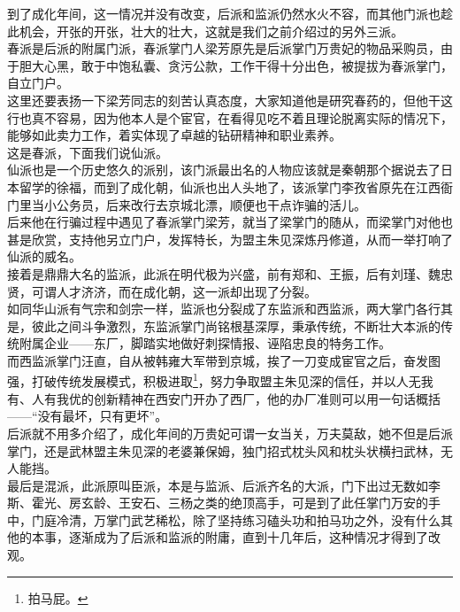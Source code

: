 \begin{multicols}{\theparacolNo}
到了成化年间，这一情况并没有改变，后派和监派仍然水火不容，而其他门派也趁此机会，开张的开张，壮大的壮大，这就是我们之前介绍过的另外三派。\\

春派是后派的附属门派，春派掌门人梁芳原先是后派掌门万贵妃的物品采购员，由于胆大心黑，敢于中饱私囊、贪污公款，工作干得十分出色，被提拔为春派掌门，自立门户。\\

这里还要表扬一下梁芳同志的刻苦认真态度，大家知道他是研究春药的，但他干这行也真不容易，因为他本人是个宦官，在看得见吃不着且理论脱离实际的情况下，能够如此卖力工作，着实体现了卓越的钻研精神和职业素养。\\

这是春派，下面我们说仙派。\\

仙派也是一个历史悠久的派别，该门派最出名的人物应该就是秦朝那个据说去了日本留学的徐福，而到了成化朝，仙派也出人头地了，该派掌门李孜省原先在江西衙门里当小公务员，后来改行去京城北漂，顺便也干点诈骗的活儿。\\

后来他在行骗过程中遇见了春派掌门梁芳，就当了梁掌门的随从，而梁掌门对他也甚是欣赏，支持他另立门户，发挥特长，为盟主朱见深炼丹修道，从而一举打响了仙派的威名。\\

接着是鼎鼎大名的监派，此派在明代极为兴盛，前有郑和、王振，后有刘瑾、魏忠贤，可谓人才济济，而在成化朝，这一派却出现了分裂。\\

如同华山派有气宗和剑宗一样，监派也分裂成了东监派和西监派，两大掌门各行其是，彼此之间斗争激烈，东监派掌门尚铭根基深厚，秉承传统，不断壮大本派的传统附属企业——东厂，脚踏实地做好刺探情报、诬陷忠良的特务工作。\\

而西监派掌门汪直，自从被韩雍大军带到京城，挨了一刀变成宦官之后，奋发图强，打破传统发展模式，积极进取\footnote{拍马屁。}，努力争取盟主朱见深的信任，并以人无我有、人有我优的创新精神在西安门开办了西厂，他的办厂准则可以用一句话概括——“没有最坏，只有更坏”。\\

后派就不用多介绍了，成化年间的万贵妃可谓一女当关，万夫莫敌，她不但是后派掌门，还是武林盟主朱见深的老婆兼保姆，独门招式枕头风和枕头状横扫武林，无人能挡。\\

最后是混派，此派原叫臣派，本是与监派、后派齐名的大派，门下出过无数如李斯、霍光、房玄龄、王安石、三杨之类的绝顶高手，可是到了此任掌门万安的手中，门庭冷清，万掌门武艺稀松，除了坚持练习磕头功和拍马功之外，没有什么其他的本事，逐渐成为了后派和监派的附庸，直到十几年后，这种情况才得到了改观。\\


\end{multicols}
